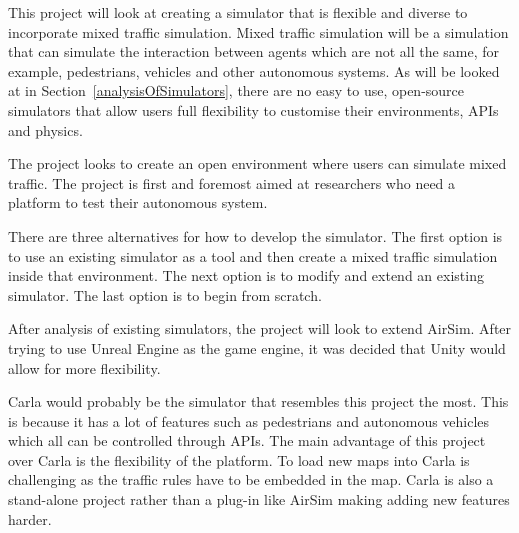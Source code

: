 

 



This project will look at creating a simulator that is flexible and diverse to incorporate mixed traffic simulation. Mixed traffic simulation will be a simulation that can simulate the interaction between agents which are not all the same, for example, pedestrians, vehicles and other autonomous systems. As will be looked at in Section~\ref{analysisOfSimulators}, there are no easy to use, open-source simulators that allow users full flexibility to customise their environments, APIs and physics.

The project looks to create an open environment where users can simulate mixed traffic. The project is first and foremost aimed at researchers who need a platform to test their autonomous system. 

There are three alternatives for how to develop the simulator. The first option is to use an existing simulator as a tool and then create a mixed traffic simulation inside that environment. The next option is to modify and extend an existing simulator. The last option is to begin from scratch.   

After analysis of existing simulators, the project will look to extend AirSim. After trying to use Unreal Engine as the game engine, it was decided that Unity would allow for more flexibility.  

Carla would probably be the simulator that resembles this project the most. This is because it has a lot of features such as pedestrians and autonomous vehicles which all can be controlled through APIs. The main advantage of this project over Carla is the flexibility of the platform. To load new maps into Carla is challenging as the traffic rules have to be embedded in the map. Carla is also a stand-alone project rather than a plug-in like AirSim making adding new features harder. 